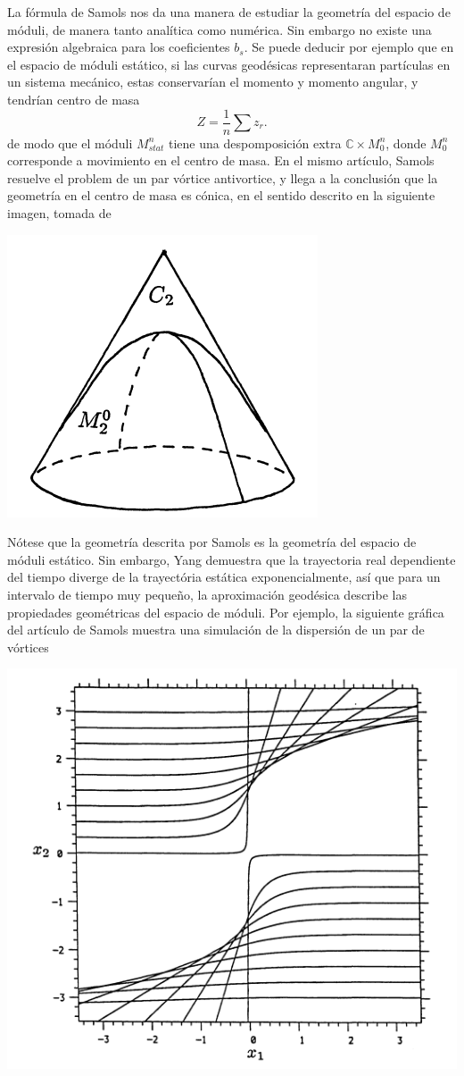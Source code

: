 \documentclass[spanish]{amsart}
\newcommand*{\C}{\mathbb{C}}
\begin{document}
La fórmula de Samols nos da una manera de estudiar la geometría del
espacio de móduli, de manera tanto analítica como numérica. Sin
embargo no existe una expresión algebraica para los coeficientes \(b_s
\). Se puede deducir por ejemplo que en el espacio de móduli estático,
si las curvas geodésicas representaran partículas en un sistema
mecánico, estas conservarían el momento y momento angular, y tendrían
centro de masa
\begin{equation}
\label{eq:centre-of-mass}
Z = \frac{1}{n} \sum z_r.
\end{equation}
de modo que el móduli \(M_{stat}^n \) tiene una despomposición extra
\(\C \times M_0^n\), donde \(M_0^n \) corresponde a movimiento en el
centro de masa. En el mismo artículo, Samols resuelve el problem de un
par vórtice antivortice, y llega a la conclusión que la geometría en
el centro de masa es cónica, en el sentido descrito en la siguiente
imagen, tomada de \cite{samols1992}
\begin{center}
  \includegraphics[width=0.3\linewidth]{img/conic-geometry}
\end{center}

Nótese que la geometría descrita por Samols es la geometría del
espacio de móduli estático. Sin embargo, Yang demuestra
\cite{yang1999strings} que la trayectoria real dependiente del tiempo
diverge de la trayectória estática exponencialmente, así que para un
intervalo de tiempo muy pequeño, la aproximación geodésica describe
las propiedades geométricas del espacio de móduli. Por ejemplo, la
siguiente gráfica del artículo de Samols muestra una simulación de la
dispersión de un par de vórtices
\begin{center}
  \includegraphics[width=0.3\linewidth]{img/vortex-scattering}
\end{center}


{}
\end{document}
